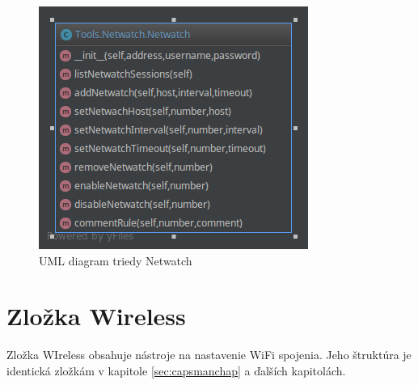 \begin{figure}[H]
\centering
\includegraphics[scale=0.6]{../text/Netwatch.png}
\caption{UML diagram triedy Netwatch}
\label{fig:netwatchuml}
\end{figure}
\section{Zložka Wireless}
Zložka WIreless obsahuje nástroje na nastavenie WiFi spojenia. Jeho štruktúra je identická zložkám v kapitole \ref{sec:capsmanchap} a ďalších kapitolách.
